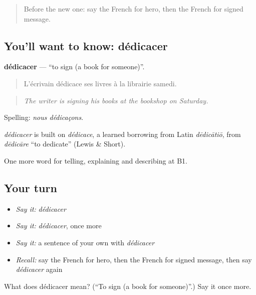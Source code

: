 \label{lesson:FR-C521-dedicacer}



\begin{quote}
Before the new one: say the French for hero, then the French for signed message.
\end{quote}

\subsection*{You'll want to know: dédicacer}
\textbf{dédicacer} — \textquotedblleft{}to sign (a book for someone)\textquotedblright{}.

\begin{quote}
L'écrivain dédicace ses livres à la librairie samedi.
\end{quote}

\begin{quote}
\emph{The writer is signing his books at the bookshop on Saturday.}
\end{quote}

Spelling: \emph{nous dédicaçons}.

\begin{cousinweb}
\emph{dédicacer} is built on \emph{dédicace}, a learned borrowing from Latin \emph{dēdicātiō}, from \emph{dēdicāre} \textquotedblleft{}to dedicate\textquotedblright{} (Lewis \& Short).
\end{cousinweb}

\begin{grammarlens}[title={What you've built}]
One more word for telling, explaining and describing at B1.
\end{grammarlens}

\subsection*{Your turn}
\begin{itemize}
\raggedright
  \item \emph{Say it:} \emph{dédicacer}
  \item \emph{Say it:} \emph{dédicacer}, once more
  \item \emph{Say it:} a sentence of your own with \emph{dédicacer}
  \item \emph{Recall:} say the French for hero, then the French for signed message, then say \emph{dédicacer} again
\end{itemize}

\begin{tcolorbox}[breakable,colback=teal!4,colframe=teal!35!black,title={Before you move on}]
What does dédicacer mean? (\textquotedblleft{}To sign (a book for someone)\textquotedblright{}.) Say it once more.
\end{tcolorbox}
